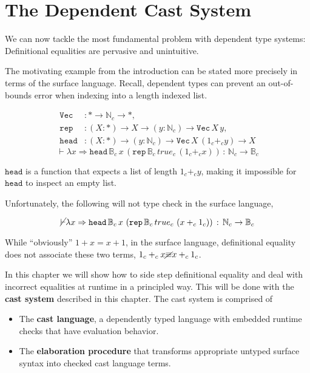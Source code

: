 \chapter{The Dependent Cast System}
\label{chapter:Cast}
\thispagestyle{myheadings}
 
We can now tackle the most fundamental problem with dependent type systems: Definitional equalities are pervasive and unintuitive.
 
The motivating example from the introduction can be stated more precisely in terms of the surface language.
Recall, dependent types can prevent an out-of-bounds error when indexing into a length indexed list.
 
\begin{align*}
\mathtt{Vec} & :*\rightarrow\mathbb{N}_{c}\rightarrow*,\\
\mathtt{rep} & :\left(X:*\right)\rightarrow X\rightarrow\left(y:\mathbb{N}_{c}\right)\rightarrow\mathtt{Vec\,}X\,y,\\
\mathtt{head} & :\left(X:*\right)\rightarrow\left(y:\mathbb{N}_{c}\right)\rightarrow\mathtt{Vec}\,X\,\left(1_{c}+_{c}y\right)\rightarrow X
\end{align*}
\[
\vdash\lambda x\Rightarrow\mathtt{head}\,\mathbb{B}_{c}\,x\,\left(\mathtt{rep}\,\mathbb{B}_{c}\,true_{c}\,\left(1_{c}+_{c}x\right)\right)\,:\,\mathbb{N}_{c}\rightarrow\mathbb{B}_{c}
\]
 
$\mathtt{head}$ is a function that expects a list of length $1_{c}+_{c}y$, making it impossible for $\mathtt{head}$ to inspect an empty list.
 
Unfortunately, the following will not type check in the surface language,
 
\[
\cancel{\vdash}\lambda x\Rightarrow\mathtt{head}\,\mathbb{B}_{c}\,x\,\left(\mathtt{rep}\,\mathbb{B}_{c}\,true_{c}\,\left(x+_{c}1_{c}\right)\right)\,:\,\mathbb{N}_{c}\rightarrow\mathbb{B}_{c}
\]
 
\sloppy While ``obviously'' $1+x=x+1$, in the surface language, definitional equality does not associate these two terms, $1_{c}+_{c}x\cancel{\equiv}x+_{c}1_{c}$.
 
In this chapter we will show how to side step definitional equality and deal with incorrect equalities at runtime in a principled way.
This will be done with the \textbf{cast system} described in this chapter.
The cast system is comprised of
\begin{itemize}
\item The \textbf{cast language}, a dependently typed language with embedded runtime checks that have evaluation behavior.
\item The \textbf{elaboration procedure} that transforms appropriate untyped surface syntax into checked cast language terms.
\end{itemize}
 
